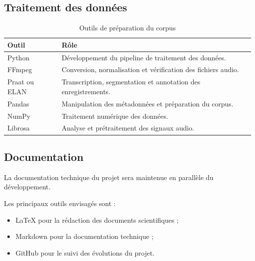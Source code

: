 
\subsection{Traitement des données}

\begin{table}[H]

\centering

\begin{tabular}{p{4cm}p{9cm}}

\toprule

\textbf{Outil} & \textbf{Rôle} \\

\midrule

Python &
Développement du pipeline de traitement des données. \\

FFmpeg &
Conversion, normalisation et vérification des fichiers audio. \\

Praat ou ELAN &
Transcription, segmentation et annotation des enregistrements. \\

Pandas &
Manipulation des métadonnées et préparation du corpus. \\

NumPy &
Traitement numérique des données. \\

Librosa &
Analyse et prétraitement des signaux audio. \\

\bottomrule

\end{tabular}

\caption{Outils de préparation du corpus}

\end{table}


\subsection{Documentation}

La documentation technique du projet sera maintenue en parallèle du
développement.

Les principaux outils envisagés sont :

\begin{itemize}

\item LaTeX pour la rédaction des documents scientifiques ;

\item Markdown pour la documentation technique ;

\item GitHub pour le suivi des évolutions du projet.

\end{itemize}


